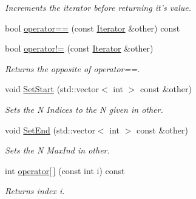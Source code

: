 \begin{DoxyCompactItemize}
\begin{DoxyCompactList}\small\item\em Increments the iterator before returning it's value. \item\end{DoxyCompactList}\item 
bool \hyperlink{classJKBuilder_1_1Iterator_a1ea001976a5bc8ae8dc365e2a912b59a}{operator==} (const \hyperlink{classJKBuilder_1_1Iterator}{Iterator} \&other) const 
\item 
bool \hyperlink{classJKBuilder_1_1Iterator_a8c06af8ae0d9d1614ae9f81629275926}{operator!=} (const \hyperlink{classJKBuilder_1_1Iterator}{Iterator} \&other)
\begin{DoxyCompactList}\small\item\em Returns the opposite of operator==. \item\end{DoxyCompactList}\item 
void \hyperlink{classJKBuilder_1_1Iterator_aa83de505e29125c1d3ac7bb1b13ca15a}{SetStart} (std::vector$<$ int $>$ const \&other)
\begin{DoxyCompactList}\small\item\em Sets the N Indices to the N given in other. \item\end{DoxyCompactList}\item 
void \hyperlink{classJKBuilder_1_1Iterator_aad84ec668b5f41210db34c540aaa31fc}{SetEnd} (std::vector$<$ int $>$ const \&other)
\begin{DoxyCompactList}\small\item\em Sets the N MaxInd in other. \item\end{DoxyCompactList}\item 
int \hyperlink{classJKBuilder_1_1Iterator_a74247cf730a06b23fcb1ec64e5596b25}{operator\mbox{[}$\,$\mbox{]}} (const int i) const 
\begin{DoxyCompactList}\small\item\em Returns index i. \item\end{DoxyCompactList}\end{DoxyCompactItemize}
